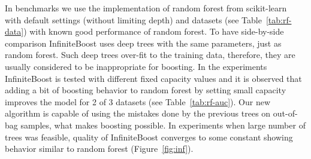 In benchmarks we use the implementation of random forest from scikit-learn~\cite{key-sklearn}
with default settings (without limiting depth) and datasets (see Table~\ref{tab:rf-data}) with known good performance of random forest.
To have side-by-side comparison InfiniteBoost uses deep trees with the same parameters, just as random forest.
Such deep trees over-fit to the training data, therefore, they are usually considered to be inappropriate for boosting.
In the experiments InfiniteBoost is tested with different fixed capacity values and it is observed that
adding a bit of boosting behavior to random forest by setting small capacity improves the model for 2 of 3 datasets (see Table~\ref{tab:rf-auc}).
Our new algorithm is capable of using the mistakes done by the previous trees on out-of-bag samples, what makes boosting possible.
In experiments when large number of trees was feasible, quality of InfiniteBoost converges to some constant
showing behavior similar to random forest (Figure~\ref{fig:inf}).

\insertplotsforestnips

\clearpagebiblio 
